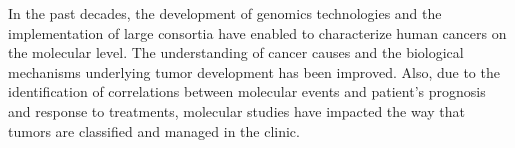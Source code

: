 In the past decades, the development of genomics technologies and the implementation of large consortia have enabled to characterize human cancers on the molecular level. The understanding of cancer causes and the biological mechanisms underlying tumor development has been improved. Also, due to the identification of correlations between molecular events and patient's prognosis and response to treatments, molecular studies have impacted the way that tumors are classified and managed in the clinic. 

